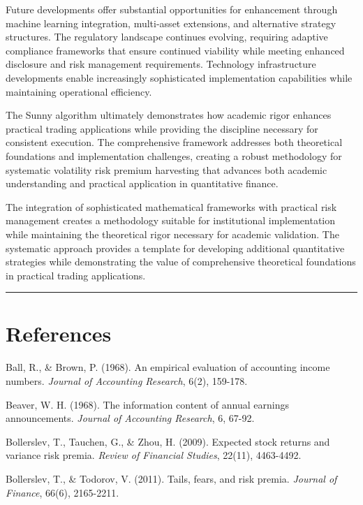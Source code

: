 \documentclass[
  american,
  11pt,
  11pt,
  letterpaper,
  onecolumn]{article}
\begin{document}
Future developments offer substantial opportunities for enhancement
through machine learning integration, multi-asset extensions, and
alternative strategy structures. The regulatory landscape continues
evolving, requiring adaptive compliance frameworks that ensure continued
viability while meeting enhanced disclosure and risk management
requirements. Technology infrastructure developments enable increasingly
sophisticated implementation capabilities while maintaining operational
efficiency.

The Sunny algorithm ultimately demonstrates how academic rigor enhances
practical trading applications while providing the discipline necessary
for consistent execution. The comprehensive framework addresses both
theoretical foundations and implementation challenges, creating a robust
methodology for systematic volatility risk premium harvesting that
advances both academic understanding and practical application in
quantitative finance.

The integration of sophisticated mathematical frameworks with practical
risk management creates a methodology suitable for institutional
implementation while maintaining the theoretical rigor necessary for
academic validation. The systematic approach provides a template for
developing additional quantitative strategies while demonstrating the
value of comprehensive theoretical foundations in practical trading
applications.

\begin{center}\rule{0.5\linewidth}{0.5pt}\end{center}

\section{References}\label{references}

Ball, R., \& Brown, P. (1968). An empirical evaluation of accounting
income numbers. \emph{Journal of Accounting Research}, 6(2), 159-178.

Beaver, W. H. (1968). The information content of annual earnings
announcements. \emph{Journal of Accounting Research}, 6, 67-92.

Bollerslev, T., Tauchen, G., \& Zhou, H. (2009). Expected stock returns
and variance risk premia. \emph{Review of Financial Studies}, 22(11),
4463-4492.

Bollerslev, T., \& Todorov, V. (2011). Tails, fears, and risk premia.
\emph{Journal of Finance}, 66(6), 2165-2211.
\end{document}
